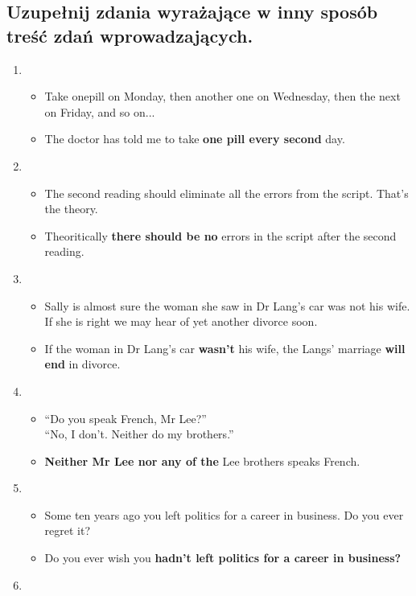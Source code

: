 \documentclass[a4paper]{article}
\begin{document}
\subsection*{Uzupełnij zdania wyrażające w inny sposób treść zdań wprowadzających.}
\begin{enumerate}
    \item \begin{itemize}
        \item Take onepill on Monday, then another one on Wednesday, then the next on Friday, and so on...
        \item The doctor has told me to take {\bf one pill every second} day.
    \end{itemize}
    \item \begin{itemize}
        \item The second reading should eliminate all the errors from the script. That's the theory.
        \item Theoritically {\bf there should be no} errors in the script after the second reading.
    \end{itemize}
    \item \begin{itemize}
        \item Sally is almost sure the woman she saw in Dr Lang's car was not his wife. If she is right we may hear of yet another divorce soon.
        \item If the woman in Dr Lang's car {\bf wasn't} his wife, the Langs' marriage {\bf will end} in divorce. 
    \end{itemize}
    \item \begin{itemize}
        \item ``Do you speak French, Mr Lee?''\\``No, I don't. Neither do my brothers.''
        \item {\bf Neither Mr Lee nor any of the} Lee brothers speaks French.
    \end{itemize}
    \item \begin{itemize}
        \item Some ten years ago you left politics for a career in business. Do you ever regret it?
        \item Do you ever wish you {\bf hadn't left politics for a career in business?}
    \end{itemize}
    \item \begin{itemize}

\end{itemize}
\end{enumerate}
\end{document}
